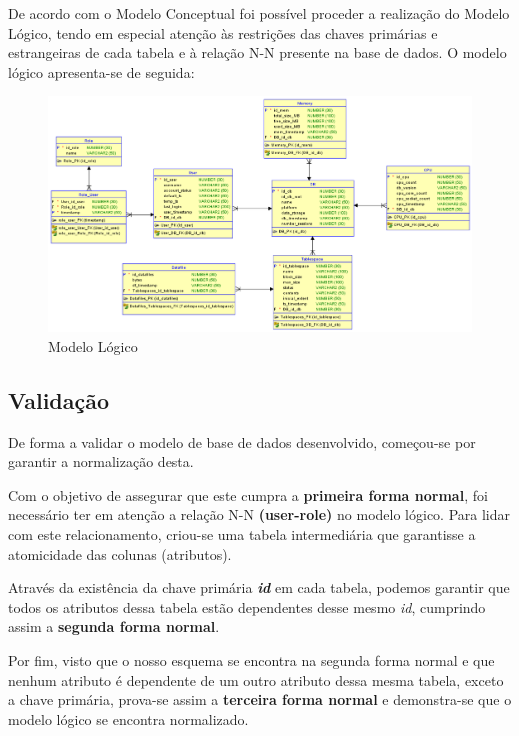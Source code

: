 \documentclass[a4paper]{article}
\begin{document}
De acordo com o Modelo Conceptual foi possível proceder a realização do Modelo Lógico, tendo em especial atenção às restrições das chaves primárias e estrangeiras de cada tabela e à relação N-N presente na base de dados. O modelo lógico apresenta-se de seguida:

\begin{figure}[H]
\centering
\includegraphics[scale=0.6]{modelo_logico.png}
\caption{Modelo Lógico}
\end{figure}



\subsection{Validação}
\hspace{3mm} 
De forma a validar o modelo de base de dados desenvolvido, começou-se por garantir a normalização desta. 

Com o objetivo de assegurar que este cumpra a \textbf{primeira forma normal}, foi necessário ter em atenção a relação N-N \textbf{(user-role)} no modelo lógico. Para lidar com este relacionamento, criou-se uma tabela intermediária que garantisse a atomicidade das colunas (atributos). 

Através da existência da chave primária \emph{\textbf{id}} em cada tabela, podemos garantir que todos os atributos dessa tabela estão dependentes desse mesmo \emph{id}, cumprindo assim a \textbf{segunda forma normal}. 

Por fim, visto que o nosso esquema se encontra na segunda forma normal e que nenhum atributo é dependente de um outro atributo dessa mesma tabela, exceto a chave primária, prova-se assim a \textbf{terceira forma normal} e demonstra-se que o modelo lógico se encontra normalizado.\\
\end{document}

